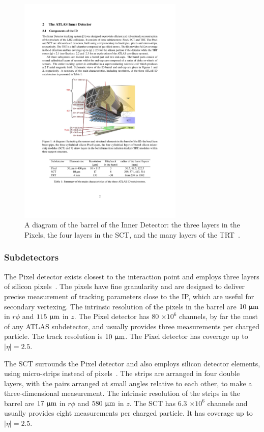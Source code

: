 \begin{figure}[tp]
  \centering
  \includegraphics[width=0.7\textwidth]{figures/lhc-atlas/detector-ID}
  \caption{A diagram of the barrel of the Inner Detector: the three layers in the Pixels, the four layers in the SCT, and the many layers of the TRT~\cite{ATLAS-CONF-2014-047}.}
  \label{fig:atlas-detector-id}
\end{figure}

\subsubsection{Subdetectors}

The Pixel detector exists closest to the interaction point and employs three layers of silicon pixels~\cite{cern-jinst-atlas}. The pixels have fine granularity and are designed to deliver precise measurement of tracking parameters close to the IP, which are useful for secondary vertexing. The intrinsic resolution of the pixels in the barrel are $10\ \upmu\text{m}$ in $r\phi$ and $115\ \upmu\text{m}$ in $z$. The Pixel detector has 80 $\times 10^{6}$ channels, by far the most of any ATLAS subdetector, and usually provides three measurements per charged particle. The track resolution is $10\ \upmu\text{m}$. The Pixel detector has coverage up to $|\eta|=2.5$.

The SCT surrounds the Pixel detector and also employs silicon detector elements, using micro-strips instead of pixels~\cite{cern-jinst-atlas}. The strips are arranged in four double layers, with the pairs arranged at small angles relative to each other, to make a three-dimensional measurement. The intrinsic resolution of the strips in the barrel are $17\ \upmu\text{m}$ in $r\phi$ and $580\ \upmu\text{m}$ in $z$. The SCT has 6.3 $\times 10^{6}$ channels and usually provides eight measurements per charged particle. It has coverage up to $|\eta|=2.5$.

